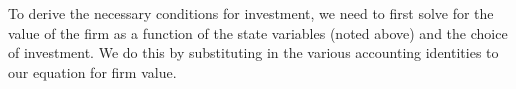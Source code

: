 To derive the necessary conditions for investment, we need to first solve for the value of the firm as a function of the state variables (noted above) and the choice of investment. We do this by substituting in the various accounting identities to our equation for firm value.
%
%

